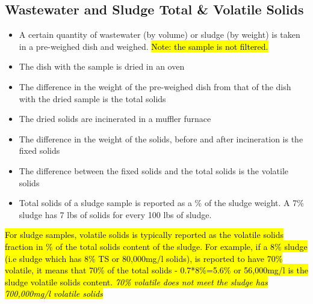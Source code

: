 	\subsection{Wastewater and Sludge Total \& Volatile Solids}
\vspace{0.4cm}
\begin{itemize}
\setlength\itemsep{1em}
					\item A certain quantity of wastewater (by volume) or sludge (by weight) is taken in a pre-weighed dish and weighed.  \hl{Note:  the sample is not filtered.}
					\item The dish with the sample is dried in an oven
					\item The difference in the weight of the pre-weighed dish from that of the dish with the dried sample is the total solids
					\item The dried solids are incinerated in a muffler furnace
					\item The difference in the weight of the solids, before and after incineration is the fixed solids
					\item The difference between the fixed solids and the total solids is the volatile solids
					\item Total solids of a sludge sample is reported as a \% of the sludge weight.  A 7\% sludge has 7 lbs of solids for every 100 lbs of sludge.
				\end{itemize}
				
				\hl{For sludge samples, volatile solids is typically reported as the volatile solids fraction in \% of the total solids content of the sludge.  For example, if a 8\% sludge (i.e sludge which has 8\% TS or 80,000mg/l solids), is reported to have 70\% volatile, it means that 70\% of the total solids - 0.7*8\%=5.6\% or 56,000mg/l is the sludge volatile solids content.  \emph{70\% volatile does not meet the sludge has 700,000mg/l volatile solids}}\\	

